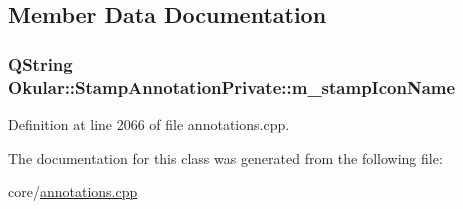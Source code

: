 \subsection{Member Data Documentation}
\hypertarget{classOkular_1_1StampAnnotationPrivate_aaa0eb79998614b5fe42f55b97ead553b}{
\subsubsection[{m\+\_\+stamp\+Icon\+Name}]{\setlength{\rightskip}{0pt plus 5cm}Q\+String Okular\+::\+Stamp\+Annotation\+Private\+::m\+\_\+stamp\+Icon\+Name}}\label{classOkular_1_1StampAnnotationPrivate_aaa0eb79998614b5fe42f55b97ead553b}


Definition at line 2066 of file annotations.\+cpp.



The documentation for this class was generated from the following file\+:\begin{DoxyCompactItemize}
\item 
core/\hyperlink{annotations_8cpp}{annotations.\+cpp}\end{DoxyCompactItemize}
